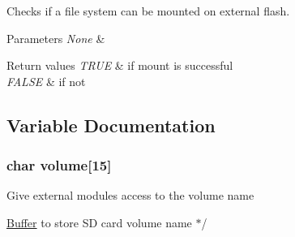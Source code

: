 Checks if a file system can be mounted on external flash. 


\begin{DoxyParams}{Parameters}
{\em None} & \\
\hline
\end{DoxyParams}

\begin{DoxyRetVals}{Return values}
{\em T\+R\+U\+E} & if mount is successful \\
\hline
{\em F\+A\+L\+S\+E} & if not \\
\hline
\end{DoxyRetVals}


\subsection{Variable Documentation}
\hypertarget{group__file__handler_ga4668281938481f362ee46f7bbf829efc}{}
\subsubsection[{volume}]{\setlength{\rightskip}{0pt plus 5cm}char volume\mbox{[}15\mbox{]}}\label{group__file__handler_ga4668281938481f362ee46f7bbf829efc}
Give external modules access to the volume name


\begin{DoxyItemize}
\item \hyperlink{struct_buffer}{Buffer} to store S\+D card volume name $\ast$/ 
\end{DoxyItemize}